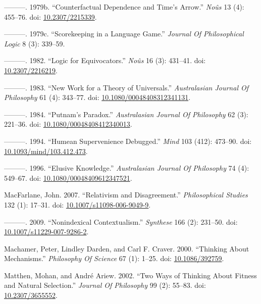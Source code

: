 \documentclass[
  10pt,
  letterpaper,
  DIV=11,
  numbers=noendperiod,
  twoside]{scrartcl}
\newlength{\cslhangindent}
\newenvironment{CSLReferences}[2] %
 {\begin{list}{}{%
  \setlength{\itemindent}{0pt}
  \setlength{\leftmargin}{0pt}
  \setlength{\parsep}{0pt}
  \ifodd #1
   \setlength{\leftmargin}{\cslhangindent}
   \setlength{\itemindent}{-1\cslhangindent}
  \fi
  \setlength{\itemsep}{#2\baselineskip}}}
 {\end{list}}
\begin{document}
\begin{CSLReferences}{1}{0}
---------. 1979b. {``Counterfactual Dependence and Time's Arrow.''}
\emph{Noûs} 13 (4): 455--76. doi:
\href{https://doi.org/10.2307/2215339}{10.2307/2215339}.

---------. 1979c. {``Scorekeeping in a Language Game.''} \emph{Journal
Of Philosophical Logic} 8 (3): 339--59.

---------. 1982. {``Logic for Equivocators.''} \emph{Noûs} 16 (3):
431--41. doi: \href{https://doi.org/10.2307/2216219}{10.2307/2216219}.

---------. 1983. {``New Work for a Theory of Universals.''}
\emph{Australasian Journal Of Philosophy} 61 (4): 343--77. doi:
\href{https://doi.org/10.1080/00048408312341131}{10.1080/00048408312341131}.

---------. 1984. {``Putnam's Paradox.''} \emph{Australasian Journal Of
Philosophy} 62 (3): 221--36. doi:
\href{https://doi.org/10.1080/00048408412340013}{10.1080/00048408412340013}.

---------. 1994. {``Humean Supervenience Debugged.''} \emph{Mind} 103
(412): 473--90. doi:
\href{https://doi.org/10.1093/mind/103.412.473}{10.1093/mind/103.412.473}.

---------. 1996. {``Elusive Knowledge.''} \emph{Australasian Journal Of
Philosophy} 74 (4): 549--67. doi:
\href{https://doi.org/10.1080/00048409612347521}{10.1080/00048409612347521}.

MacFarlane, John. 2007. {``Relativism and Disagreement.''}
\emph{Philosophical Studies} 132 (1): 17--31. doi:
\href{https://doi.org/10.1007/s11098-006-9049-9}{10.1007/s11098-006-9049-9}.

---------. 2009. {``Nonindexical Contextualism.''} \emph{Synthese} 166
(2): 231--50. doi:
\href{https://doi.org/10.1007/s11229-007-9286-2}{10.1007/s11229-007-9286-2}.

Machamer, Peter, Lindley Darden, and Carl F. Craver. 2000. {``Thinking
About Mechanisms.''} \emph{Philosophy Of Science} 67 (1): 1--25. doi:
\href{https://doi.org/10.1086/392759}{10.1086/392759}.

Matthen, Mohan, and André Ariew. 2002. {``Two Ways of Thinking About
Fitness and Natural Selection.''} \emph{Journal Of Philosophy} 99 (2):
55--83. doi: \href{https://doi.org/10.2307/3655552}{10.2307/3655552}.


\end{CSLReferences}
\end{document}
